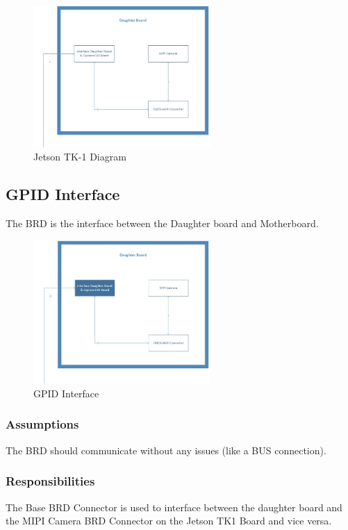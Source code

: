 
\begin{figure}[h!]
	\centering
 	\includegraphics[width=0.60\textwidth]{images/DaughterBoard}
 \caption{Jetson TK-1 Diagram}
\end{figure}

\subsection{}

\subsection{GPID Interface}
The BRD is the interface between the Daughter board and Motherboard.

\begin{figure}[h!]
	\centering
 	\includegraphics[width=0.60\textwidth]{images/DaughterBoard_Interface}
 \caption{GPID Interface}
\end{figure}

\subsubsection{Assumptions}
The BRD should communicate without any issues (like a BUS connection).

\subsubsection{Responsibilities}
The Base BRD Connector is used to interface between the daughter board and the MIPI Camera BRD Connector on the Jetson TK1 Board and vice versa.

